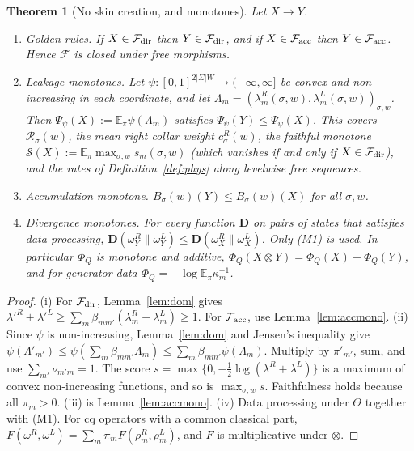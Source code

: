 \documentclass[11pt]{article}
\newtheorem{theorem}{Theorem}
\theoremstyle{definition}
\theoremstyle{remark}
\newcommand{\E}{\mathbb{E}}
\newcommand{\Free}{\mathcal{F}}
\begin{document}
\begin{theorem}[No skin creation, and monotones]\label{thm:mono}
Let $X\to Y$.
\begin{enumerate}
\item[(i)] \emph{Golden rules.} If $X\in\Free_{\rm dir}$ then $Y\in\Free_{\rm dir}$, and if $X\in\Free_{\rm acc}$ then $Y\in\Free_{\rm acc}$. Hence $\Free$ is closed under free morphisms.
\item[(ii)] \emph{Leakage monotones.} Let $\psi:[0,1]^{2|\Sigma|W}\to(-\infty,\infty]$ be convex and non-increasing in each coordinate, and let $\Lambda_m=(\lambda^R_m(\sigma,w),\lambda^L_m(\sigma,w))_{\sigma,w}$. Then $\Psi_\psi(X):=\E_\pi\psi(\Lambda_m)$ satisfies $\Psi_\psi(Y)\le\Psi_\psi(X)$. This covers $\mathcal R_\sigma(w)$, the mean right collar weight $c^R_\sigma(w)$, the faithful monotone $\mathcal S(X):=\E_\pi\max_{\sigma,w}s_m(\sigma,w)$ (which vanishes if and only if $X\in\Free_{\rm dir}$), and the rates of Definition~\ref{def:phys} along levelwise free sequences.
\item[(iii)] \emph{Accumulation monotone.} $B_\sigma(w)(Y)\le B_\sigma(w)(X)$ for all $\sigma,w$.
\item[(iv)] \emph{Divergence monotones.} For every function $\mathbf D$ on pairs of states that satisfies data processing, $\mathbf D(\omega^R_Y\|\omega^L_Y)\le\mathbf D(\omega^R_X\|\omega^L_X)$. Only (M1) is used. In particular $\Phi_Q$ is monotone and additive, $\Phi_Q(X\otimes Y)=\Phi_Q(X)+\Phi_Q(Y)$, and for generator data $\Phi_Q=-\log\E_\pi\kappa_m^{-1}$.
\end{enumerate}
\end{theorem}
\begin{proof}
(i) For $\Free_{\rm dir}$, Lemma~\ref{lem:dom} gives $\lambda'^R+\lambda'^L\ge\sum_m\beta_{mm'}(\lambda^R_m+\lambda^L_m)\ge1$. For $\Free_{\rm acc}$, use Lemma~\ref{lem:accmono}.
(ii) Since $\psi$ is non-increasing, Lemma~\ref{lem:dom} and Jensen's inequality give $\psi(\Lambda'_{m'})\le\psi(\sum_m\beta_{mm'}\Lambda_m)\le\sum_m\beta_{mm'}\psi(\Lambda_m)$. Multiply by $\pi'_{m'}$, sum, and use $\sum_{m'}\nu_{m'm}=1$. The score $s=\max\{0,-\frac12\log(\lambda^R+\lambda^L)\}$ is a maximum of convex non-increasing functions, and so is $\max_{\sigma,w}s$. Faithfulness holds because all $\pi_m>0$.
(iii) is Lemma~\ref{lem:accmono}. (iv) Data processing under $\Theta$ together with (M1). For cq operators with a common classical part, $F(\omega^R,\omega^L)=\sum_m\pi_mF(\rho^R_m,\rho^L_m)$, and $F$ is multiplicative under $\otimes$.
\end{proof}
\end{document}
